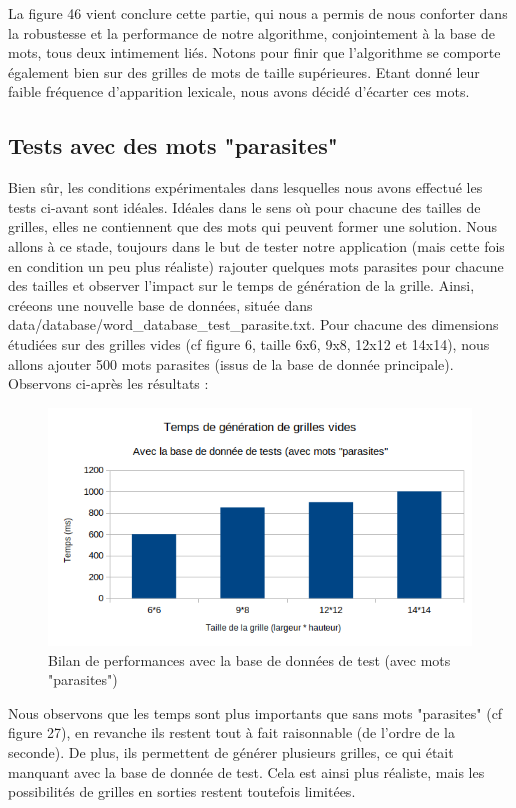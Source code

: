 \documentclass [ 11 pt ] {article}
\begin{document}
        La figure 46 vient conclure cette partie, qui nous a permis de nous conforter dans la robustesse et la performance de notre algorithme, conjointement à la base de mots, tous deux intimement liés. Notons pour finir que l'algorithme se comporte également bien sur des grilles de mots de taille supérieures. Etant donné leur faible fréquence d'apparition lexicale, nous avons décidé d'écarter ces mots. 
        
        \subsection{Tests avec des mots "parasites"}
        
        Bien sûr, les conditions expérimentales dans lesquelles nous avons effectué les tests ci-avant sont idéales. Idéales dans le sens où pour chacune des tailles de grilles, elles ne contiennent que des mots qui peuvent former une solution. Nous allons à ce stade, toujours dans le but de tester notre application (mais cette fois en condition un peu plus réaliste) rajouter quelques mots parasites pour chacune des tailles et observer l'impact sur le temps de génération de la grille. Ainsi, créeons une nouvelle base de données, située dans data/database/word\_database\_test\_parasite.txt. Pour chacune des dimensions étudiées sur des grilles vides (cf figure 6, taille 6x6, 9x8, 12x12 et 14x14), nous allons ajouter 500 mots parasites (issus de la base de donnée principale). Observons ci-après les résultats : 
        
        \begin{figure}[H] 
            \center 
            \includegraphics[width=0.7\linewidth]{test_parasite.png}
            \caption{Bilan de performances avec la base de données de test (avec mots "parasites")}
        \end{figure}
        
        Nous observons que les temps sont plus importants que sans mots "parasites" (cf figure 27), en revanche ils restent tout à fait raisonnable (de l'ordre de la seconde). De plus, ils permettent de générer plusieurs grilles, ce qui était manquant avec la base de donnée de test. Cela est ainsi plus réaliste, mais les possibilités de grilles en sorties restent toutefois limitées. 
        
\end{document}
